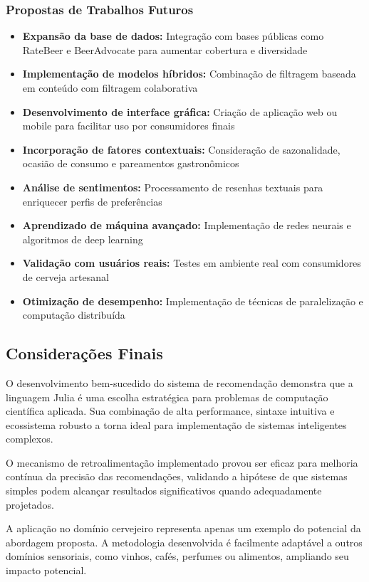 \documentclass[12pt,a4paper]{article}
\begin{document}
\subsubsection{Propostas de Trabalhos Futuros}

\begin{itemize}
\item \textbf{Expansão da base de dados:} Integração com bases públicas como RateBeer e BeerAdvocate para aumentar cobertura e diversidade
\item \textbf{Implementação de modelos híbridos:} Combinação de filtragem baseada em conteúdo com filtragem colaborativa
\item \textbf{Desenvolvimento de interface gráfica:} Criação de aplicação web ou mobile para facilitar uso por consumidores finais
\item \textbf{Incorporação de fatores contextuais:} Consideração de sazonalidade, ocasião de consumo e pareamentos gastronômicos
\item \textbf{Análise de sentimentos:} Processamento de resenhas textuais para enriquecer perfis de preferências
\item \textbf{Aprendizado de máquina avançado:} Implementação de redes neurais e algoritmos de deep learning
\item \textbf{Validação com usuários reais:} Testes em ambiente real com consumidores de cerveja artesanal
\item \textbf{Otimização de desempenho:} Implementação de técnicas de paralelização e computação distribuída
\end{itemize}

\subsection{Considerações Finais}

O desenvolvimento bem-sucedido do sistema de recomendação demonstra que a linguagem Julia é uma escolha estratégica para problemas de computação científica aplicada. Sua combinação de alta performance, sintaxe intuitiva e ecossistema robusto a torna ideal para implementação de sistemas inteligentes complexos.

O mecanismo de retroalimentação implementado provou ser eficaz para melhoria contínua da precisão das recomendações, validando a hipótese de que sistemas simples podem alcançar resultados significativos quando adequadamente projetados.

A aplicação no domínio cervejeiro representa apenas um exemplo do potencial da abordagem proposta. A metodologia desenvolvida é facilmente adaptável a outros domínios sensoriais, como vinhos, cafés, perfumes ou alimentos, ampliando seu impacto potencial.
\end{document}
